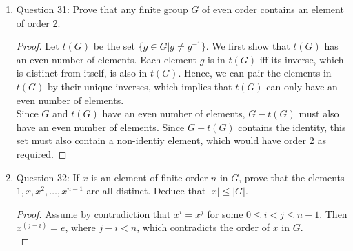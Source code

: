 \documentclass{article}
\begin{document}
\begin{enumerate}
\begin{enumerate}
\begin{proof}
          Now
          \begin{align*}
            (a,b)^n & = ((a,1)(1,b))^n && \\
                    & = (a,1)^n(1,b)^n && \text{because $(a,1)$ and $(1,b)$
                    commute} \\
                    & = (a^n,1)(1,b^n) && \\
                    & = (a^n,b^n),     &&
          \end{align*}
          which equals $(1,1)$ iff $a^n=b^n=1$. Hence $ord((a,b))$ is the
          least common multiple of $ord(a)$ and $ord(b)$.
        \end{proof}
      \item Question 31: Prove that any finite group $G$ of even order
        contains an element of order 2.
        \begin{proof}
          Let $t(G)$ be the set $\{g\in G | g \neq g^{-1}\}$. We first show
          that $t(G)$ has an even number of elements. Each element $g$ is
          in $t(G)$ iff its inverse, which is distinct from itself, is also
          in $t(G)$. Hence, we can pair the elements in $t(G)$ by their
          unique inverses, which implies that $t(G)$ can only have an even
          number of elements. \\

          Since $G$ and $t(G)$ have an even number of elements, $G-t(G)$
          must also have an even number of elements. Since $G-t(G)$
          contains the identity, this set must also contain a non-identiy
          element, which would have order 2 as required.
        \end{proof}
      \item Question 32: If $x$ is an element of finite order $n$ in $G$,
        prove that the elements $1,x,x^2,\ldots,x^{n-1}$ are all distinct.
        Deduce that $|x|\leq |G|$.
        \begin{proof}
          Assume by contradiction that $x^i=x^j$ for some $0\leq i<j \leq
          n-1$. Then $x^{(j-i)}=e$, where $j-i<n$, which contradicts the
          order of $x$ in $G$. \\


\end{proof}
\end{enumerate}
\end{enumerate}
\end{document}
